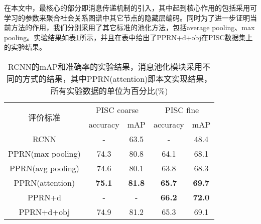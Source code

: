 在本文中，最核心的部分即消息传递机制的引入，其中起到核心作用的包括采用可学习的参数来聚合社会关系图谱中其它节点的隐藏层编码。同时为了进一步证明当前方法的作用，我们分别采用了其它标准的池化方法，包括average pooling、max pooling。实验结果如表\ref{tab:exp-mp-variant}所示，并且在表中给出了PPRN+d+obj在PISC数据集上的实验结果。
\begin{table}[htb]
	\vspace*{-3.5pt}
	\centering
	\caption{RCNN的mAP和准确率的实验结果，消息池化模块采用不同的方式的结果，其中PPRN(attention)即本文实现结果，所有实验数据的单位为百分比(\%)}
    \label{tab:exp-mp-variant}
	\vspace*{0.5mm}
	\begin{tabular}{c|c|c|c|c}
		\toprule
		\multirow{2}{*}{评价标准} &
		\multicolumn{2}{c|}{PISC coarse} &
		\multicolumn{2}{|c}{PISC fine}  \\
				 & accuracy & mAP & accuracy & mAP  \\
		\midrule
		RCNN & - & 63.5 & - & 48.4 \\
		\midrule
		PPRN(max pooling) & 74.3 & 80.8 & 64.1 & 68.1 \\
		\midrule
		PPRN(avg pooling) & 74.6 & 80.1 & 63.8 & 68.3 \\
		\midrule
		PPRN(attention) & \textbf{75.1} & \textbf{81.8} & \textbf{65.7} & \textbf{69.7} \\
		\midrule
		PPRN+d  & - & - & \textbf{66.2} & \textbf{72.0} \\
        \midrule
		PPRN+d+obj  & 74.9 & 81.2 & 65.3 & 69.1 \\
		\midrule
	\end{tabular}
\end{table}

